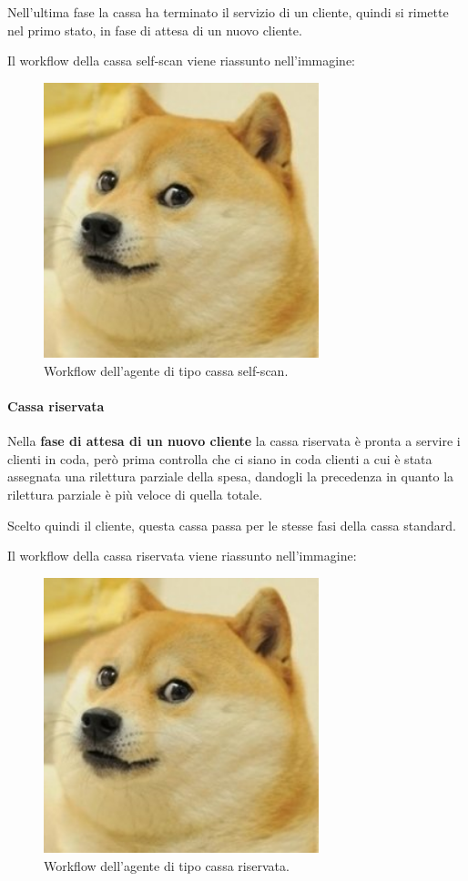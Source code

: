 Nell'ultima fase la cassa ha terminato il servizio di un cliente, quindi si rimette nel primo stato, in fase di attesa di un nuovo cliente.

Il workflow della cassa self-scan viene riassunto nell'immagine:

\begin{figure}[htp!]
	\centering
	\hspace*{3cm}
	\includegraphics[width=8cm]{"images/doggo.jpg"}
	\caption{Workflow dell'agente di tipo cassa self-scan.}
	\label{fig:workflow_customer}
\end{figure}

\paragraph{Cassa riservata}

Nella \textbf{fase di attesa di un nuovo cliente} la cassa riservata è pronta a servire i clienti in coda, però prima controlla che ci siano in coda clienti a cui è stata assegnata una rilettura parziale della spesa, dandogli la precedenza in quanto la rilettura parziale è più veloce di quella totale.

Scelto quindi il cliente, questa cassa passa per le stesse fasi della cassa standard.

Il workflow della cassa riservata viene riassunto nell'immagine:

\begin{figure}[htp!]
	\centering
	\hspace*{3cm}
	\includegraphics[width=8cm]{"images/doggo.jpg"}
	\caption{Workflow dell'agente di tipo cassa riservata.}
	\label{fig:workflow_customer}
\end{figure}

